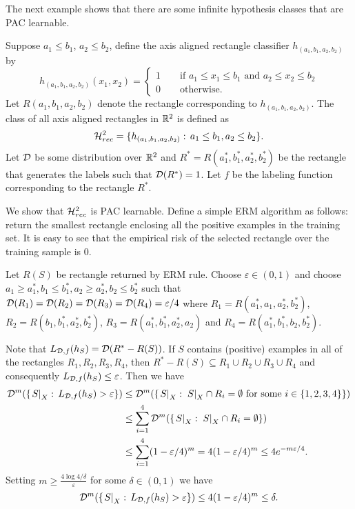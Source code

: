 \documentclass[11pt,a4paper]{article}
\begin{document}
The next example shows that there are some infinite hypothesis classes that are PAC learnable.

\begin{example}\label{ex:axis_aligned_rect}
Suppose $a_1\le b_1$, $a_2\le b_2$, define the axis aligned rectangle classifier $h_{(a_1,b_1,a_2,b_2)}$ by
\begin{equation*}
h_{(a_1,b_1,a_2,b_2)}(x_1,x_2) = 
\begin{cases}
1\qquad \text{if } a_1\le x_1\le b_1 \text{ and } a_2\le x_2\le b_2 \\
0\qquad \text{otherwise.}
\end{cases}
\end{equation*}
Let $R(a_1,b_1,a_2,b_2)$ denote the rectangle corresponding to $h_{(a_1,b_1,a_2,b_2)}$. The class of all axis aligned rectangles in $\mathbb{R}^2$ is defined as
\begin{equation*}
\mathcal{H}^2_{rec} = \{h_{(a_1,b_1,a_2,b_2)}:\, a_1\le b_1,a_2\le b_2\}.
\end{equation*}
Let $\mathcal{D}$ be some distribution over $\mathbb{R}^2$ and $R^* = R({a_1^*,b_1^*,a_2^*,b_2^*})$ be the rectangle that generates the labels such that $\mathcal{D}(R^*) = 1$. Let $f$ be the labeling function corresponding to the rectangle $R^*$.

We show that $\mathcal{H}^2_{rec}$ is PAC learnable. Define a simple ERM algorithm as follows: return the smallest rectangle enclosing all the positive examples in the training set. It is easy to see that the empirical risk of the selected rectangle over the training sample is $0$.

Let $R(S)$ be rectangle returned by ERM rule. Choose $\varepsilon\in(0,1)$ and choose $a_1\ge a_1^*,b_1\le b_1^*,a_2\ge a_2^*,b_2\le b_2^*$ such that $\mathcal{D}(R_1) = \mathcal{D}(R_2) = \mathcal{D}(R_3) = \mathcal{D}(R_4) = \varepsilon/4$ where $R_1 = R(a_1^*,a_1,a_2^*,b_2^*)$, $R_2 = R({b_1,b_1^*,a_2^*,b_2^*})$, $R_3 = R({a_1^*,b_1^*,a_2^*,a_2})$ and $R_4 = R({a_1^*,b_1^*,b_2,b_2^*})$.

Note that $L_{\mathcal{D},f}(h_S) = \mathcal{D}(R^* - R(S))$. If $S$ contains (positive) examples in all of the rectangles $R_1,R_2,R_3,R_4$, then $R^*-R(S)\subseteq R_1\cup R_2\cup R_3\cup R_4$ and consequently $L_{\mathcal{D},f}(h_S) \le \varepsilon$. Then we have
\begin{align*}
\mathcal{D}^m(\{\left.S\right|_{X}:\,L_{\mathcal{D},f}(h_S)> \varepsilon\}) &\le 
\mathcal{D}^m(\{\left.S\right|_{X}:\, \left.S\right|_{X}\cap R_i = \emptyset \text{ for some }i\in \{1,2,3,4\} \})\\
&\le \sum_{i=1}^4 \mathcal{D}^m(\{\left.S\right|_{X}:\, \left.S\right|_{X}\cap R_i = \emptyset\})\\
&\le \sum_{i=1}^4 (1-\varepsilon/4)^m = 4(1-\varepsilon/4)^m \le 4e^{-m\varepsilon/4}.
\end{align*}
Setting $m\ge \frac{4\log{ 4/\delta}}{\varepsilon}$ for some $\delta\in(0,1)$ we have 
\begin{equation*}
\mathcal{D}^m(\{\left.S\right|_{X}:\,L_{\mathcal{D},f}(h_S)> \varepsilon\}) \le  4(1-\varepsilon/4)^m \le \delta.
\end{equation*}
\end{example}
\end{document}
